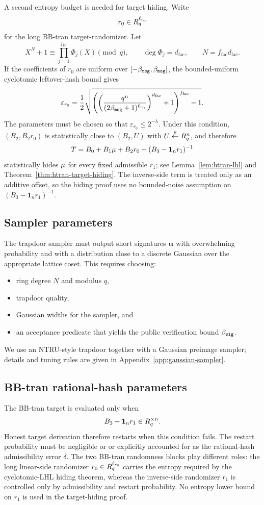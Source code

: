A second entropy budget is needed for target hiding.  Write
\[
  r_0\in R_q^{\ell_{r_0}}
\]
for the long BB-tran target-randomizer.  Let
\[
  X^N+1\equiv \prod_{j=1}^{f_{\mathrm{fac}}}\Phi_j(X)\pmod q,
  \qquad
  \deg\Phi_j=d_{\mathrm{fac}},
  \qquad
  N=f_{\mathrm{fac}}d_{\mathrm{fac}}.
\]
If the coefficients of $r_0$ are uniform over $[-\beta_{\mathtt{msg}},\beta_{\mathtt{msg}}]$, the bounded-uniform cyclotomic
leftover-hash bound gives
\[
  \varepsilon_{r_0}
  =
  \frac12
  \sqrt{
    \left(
      \left(
        \frac{q^n}{(2\beta_{\mathtt{msg}}+1)^{\ell_{r_0}}}
      \right)^{d_{\mathrm{fac}}}
      +1
    \right)^{f_{\mathrm{fac}}}
    -1
  }.
\]
The parameters must be chosen so that $\varepsilon_{r_0}\le 2^{-\lambda}$.  Under this condition,
$(B_2,B_2r_0)$ is statistically close to $(B_2,U)$ with $U\overset{\$}{\leftarrow}R_q^n$, and therefore
\[
  T=B_0+B_1\mathbf{\mu}+B_2r_0+(B_3-\mathbf 1_n r_1)^{-1}
\]
statistically hides $\mathbf{\mu}$ for every fixed admissible $r_1$; see Lemma~\ref{lem:htran-lhl} and
Theorem~\ref{thm:htran-target-hiding}.  The inverse-side term is treated only as an additive offset, so the
hiding proof uses no bounded-noise assumption on $(B_3-\mathbf 1_n r_1)^{-1}$.

\subsection{Sampler parameters}
The trapdoor sampler must output short signatures $\mathbf{u}$ with overwhelming probability and with a distribution close
to a discrete Gaussian over the appropriate lattice coset.  This requires choosing:
\begin{itemize}[leftmargin=1.25em]
  \item ring degree $N$ and modulus $q$,
  \item trapdoor quality,
  \item Gaussian widths for the sampler, and
  \item an acceptance predicate that yields the public verification bound $\beta_{\mathtt{sig}}$.
\end{itemize}
We use an NTRU-style trapdoor together with a Gaussian preimage sampler; details and tuning rules are given in
Appendix~\ref{app:gaussian-sampler}.

\subsection{BB-tran rational-hash parameters}
The BB-tran target is evaluated only when
\[
  B_3-\mathbf 1_n r_1\in R_q^{\times n}.
\]
Honest target derivation therefore restarts when this condition fails.  The restart probability must be negligible or
or explicitly accounted for as the rational-hash admissibility error $\delta$.  The two BB-tran randomness blocks
play different roles: the long linear-side randomizer $r_0\in R_q^{\ell_{r_0}}$ carries the entropy required by
the cyclotomic-LHL hiding theorem, whereas the inverse-side randomizer $r_1$ is controlled only by
admissibility and restart probability.  No entropy lower bound on $r_1$ is used in the target-hiding proof.

